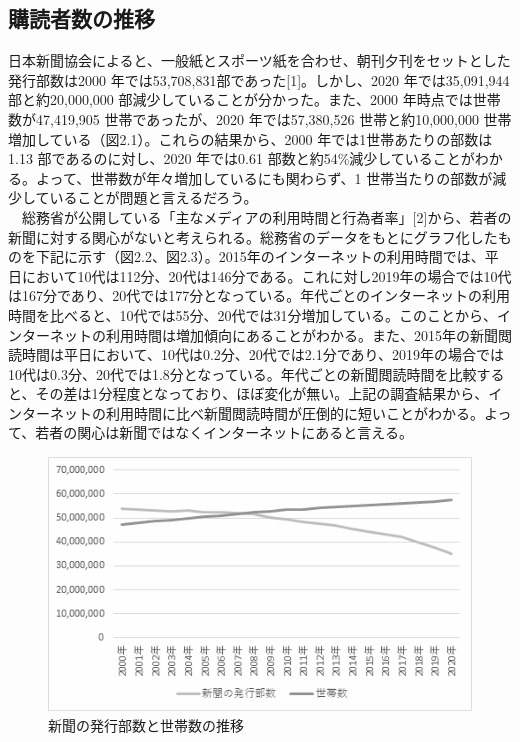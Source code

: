 \subsection{購読者数の推移}
日本新聞協会によると、一般紙とスポーツ紙を合わせ、朝刊夕刊をセットとした発行部数は2000 年では53,708,831部であった[1]。しかし、2020 年では35,091,944 部と約20,000,000 部減少していることが分かった。また、2000 年時点では世帯数が47,419,905 世帯であったが、2020 年では57,380,526 世帯と約10,000,000 世帯増加している（図2.1）。これらの結果から、2000 年では1世帯あたりの部数は1.13 部であるのに対し、2020 年では0.61 部数と約54\%減少していることがわかる。よって、世帯数が年々増加しているにも関わらず、1 世帯当たりの部数が減少していることが問題と言えるだろう。\\
　総務省が公開している「主なメディアの利用時間と行為者率」[2]から、若者の新聞に対する関心がないと考えられる。総務省のデータをもとにグラフ化したものを下記に示す（図2.2、図2.3）。2015年のインターネットの利用時間では、平日において10代は112分、20代は146分である。これに対し2019年の場合では10代は167分であり、20代では177分となっている。年代ごとのインターネットの利用時間を比べると、10代では55分、20代では31分増加している。このことから、インターネットの利用時間は増加傾向にあることがわかる。また、2015年の新聞閲読時間は平日において、10代は0.2分、20代では2.1分であり、2019年の場合では10代は0.3分、20代では1.8分となっている。年代ごとの新聞閲読時間を比較すると、その差は1分程度となっており、ほぼ変化が無い。上記の調査結果から、インターネットの利用時間に比べ新聞閲読時間が圧倒的に短いことがわかる。よって、若者の関心は新聞ではなくインターネットにあると言える。
\newpage
\begin{figure}[htbp]
    \centering
    \includegraphics[keepaspectratio, scale=0.35]{images/newspaper1.png}
    \caption{新聞の発行部数と世帯数の推移}
    \label{fig:my_label}
\end{figure}

